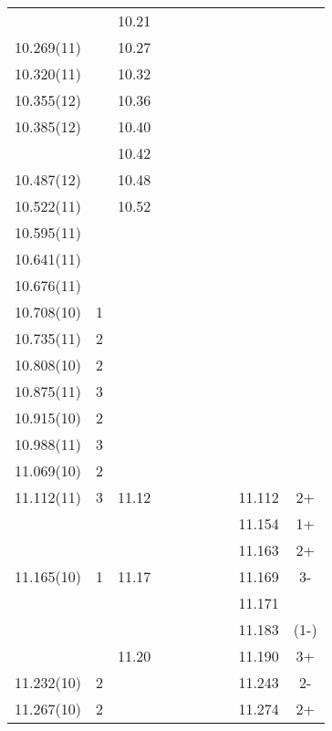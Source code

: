 \begin{landscape}
\begin{center}
\begin{longtable}{cc cc cc cc cc}
  &   & 10.21 &   &   &   &   &   &   &   \\
  10.269(11)    &   & 10.27 &   &   &   &   &   &   &   \\
  10.320(11)    &   & 10.32 &   &   &   &   &   &   &   \\
  10.355(12)    &   & 10.36 &   &   &   &   &   &   &   \\
  10.385(12)    &   & 10.40 &   &   &   &   &   &   &   \\
  &   & 10.42 &   &   &   &   &   &   &   \\
  10.487(12)    &   & 10.48 &   &   &   &   &   &   &   \\
  10.522(11)    &   & 10.52 &   &   &   &   &   &   &   \\
  10.595(11)    &   &   &   &   &   &   &   &   &   \\
     10.641(11)   &   &   &   &   &   &   &   &   &   \\
     10.676(11)   &   &   &   &   &   &   &   &   &   \\
     10.708(10)   & 1 &   &   &   &   &   &   &   &   \\
     10.735(11)   & 2 &   &   &   &   &   &   &   &   \\
     10.808(10)   & 2 &   &   &   &   &   &   &   &   \\
     10.875(11)   & 3 &   &   &   &   &   &   &   &   \\
     10.915(10)   & 2 &   &   &   &   &   &   &   &   \\
   10.988(11)     & 3 &   &   &   &   &   &   &   &   \\
    11.069(10)    & 2 &   &   &   &   &   &   &   &   \\
     11.112(11)   & 3 & 11.12 &   &   &   &   &   & 11.112  & 2+  \\
  &   &   &   &   &   &   &   & 11.154  & 1+  \\
  &   &   &   &   &   &   &   & 11.163  & 2+  \\
    11.165(10)    & 1 & 11.17 &   &   &   &   &   & 11.169  & 3-  \\
  &   &   &   &   &   &   &   & 11.171  &   \\
  &   &   &   &   &   &   &   & 11.183  & (1-)  \\
  &   & 11.20 &   &   &   &   &   & 11.190  & 3+  \\
    11.232(10)    & 2 &   &   &   &   &   &   & 11.243  & 2-  \\
    11.267(10)    & 2 &   &   &   &   &   &   & 11.274  & 2+  \\

\end{longtable}
\end{center}
\end{landscape}
